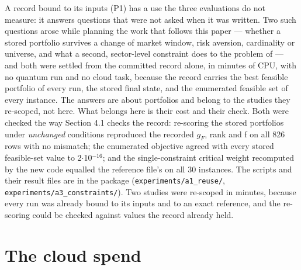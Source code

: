 \documentclass[acmsmall,screen,review]{acmart}
\begin{document}
A record bound to its inputs (P1) has a use the three evaluations do not measure: it answers questions that were not asked when it was written. Two such questions arose while planning the work that follows this paper --- whether a stored portfolio survives a change of market window, risk aversion, cardinality or universe, and what a second, sector-level constraint does to the problem of \cite{ref1} --- and both were settled from the committed record alone, in minutes of CPU, with no quantum run and no cloud task, because the record carries the best feasible portfolio of every run, the stored final state, and the enumerated feasible set of every instance. The answers are about portfolios and belong to the studies they re-scoped, not here. What belongs here is their cost and their check. Both were checked the way Section 4.1 checks the record: re-scoring the stored portfolios under \textit{unchanged} conditions reproduced the recorded $g_{F}$, rank and f on all 826 rows with no mismatch; the enumerated objective agreed with every stored feasible-set value to 2$\cdot$10$^{-16}$; and the single-constraint critical weight recomputed by the new code equalled the reference file's on all 30 instances. The scripts and their result files are in the package (\texttt{experiments/\allowbreak{}a1\_\allowbreak{}reuse/\allowbreak{}}, \texttt{experiments/\allowbreak{}a3\_\allowbreak{}constraints/\allowbreak{}}). Two studies were re-scoped in minutes, because every run was already bound to its inputs and to an exact reference, and the re-scoring could be checked against values the record already held.


\section{The cloud spend}
\end{document}
